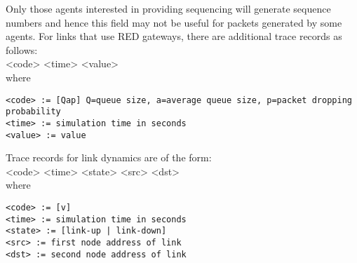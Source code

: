 \begin{flushleft}
Only those agents interested in providing sequencing will generate
sequence numbers and hence this field may not be useful for packets
generated by some agents. For links that use RED gateways, there are
additional trace records as follows: \\

<code> <time> <value> \\

where \\
\begin{verbatim}
<code> := [Qap] Q=queue size, a=average queue size, p=packet dropping
probability
<time> := simulation time in seconds 
<value> := value 
\end{verbatim}

Trace records for link dynamics are of the form: \\

<code> <time> <state> <src> <dst> \\

where \\
\begin{verbatim}
<code> := [v]
<time> := simulation time in seconds 
<state> := [link-up | link-down]
<src> := first node address of link 
<dst> := second node address of link 
\end{verbatim} 
\end{flushleft}


\endinput
